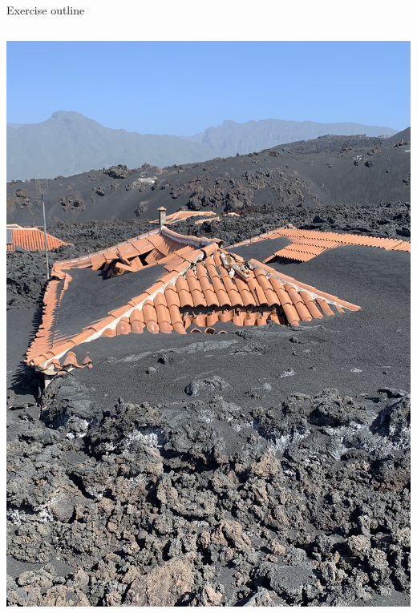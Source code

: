 \documentclass[10pt,aspectratio=169]{beamer}
\begin{document}
\begin{frame}[t]{Exercise outline}
\begin{columns}[T]
        \begin{column}{0.5\textwidth}	
           \centering \vspace*{-1em} \includegraphics[width=.8\textwidth]{img/tephra-lava.png}
            
        \end{column}
      \end{columns}
\end{frame}
\end{document}
